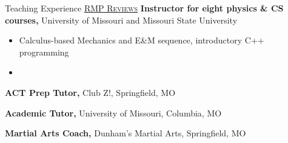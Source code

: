 

\begin{rubric}{Teaching Experience\hfill%
  \href{https://www.ratemyprofessors.com/professor/2686648}{\textsc{RMP Reviews}}}
    \entry*[2018 -- 2022]%
        \textbf{Instructor for eight physics \& CS courses,} University of Missouri and Missouri State University
        \begin{itemize}
            \item Calculus-based Mechanics and E\&M sequence, introductory C++ programming
            \item 
        \end{itemize}
    
    \entry*[2018 -- 2021]%
        \textbf{ACT Prep Tutor,} Club Z!, Springfield, MO
    
    \entry*[2021 -- Present]%
        \textbf{Academic Tutor,} University of Missouri, Columbia, MO
    
    \entry*[2014 -- 2020]%
        \textbf{Martial Arts Coach,} Dunham's Martial Arts, Springfield, MO
\end{rubric}
